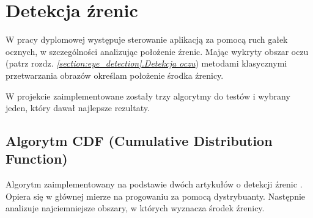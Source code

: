 \newpage

\section{Detekcja źrenic}

W pracy dyplomowej występuje sterowanie aplikacją za pomocą ruch gałek ocznych, w szczególności analizując położenie źrenic. Mając wykryty obszar oczu (patrz rozdz. \hyperref[{section:eye_detection}]{\textit{\ref{section:eye_detection}.Detekcja oczu}}) metodami klasycznymi przetwarzania obrazów określam położenie środka źrenicy.
\par
W projekcie zaimplementowane zostały trzy algorytmy do testów i wybrany jeden, który dawał najlepsze rezultaty.

\subsection{Algorytm CDF (Cumulative Distribution Function)}
Algorytm zaimplementowany na podstawie dwóch artykułów o detekcji źrenic \cite{IMECSPupilCDFAnalysis}
\cite{EyePupilWebCam}. Opiera się w głównej mierze na progowaniu za pomocą dystrybuanty. Następnie analizuje najciemniejsze obszary, w których wyznacza środek źrenicy.

